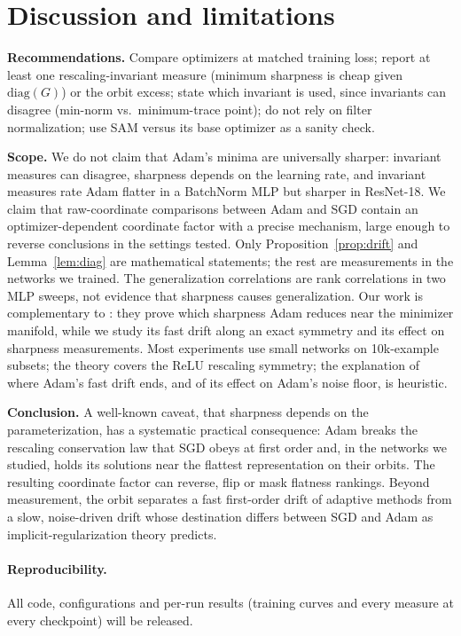 \documentclass[10pt,twocolumn]{article}
\theoremstyle{remark}
\begin{document}
\section{Discussion and limitations}
\textbf{Recommendations.} Compare optimizers at matched training loss; report at least one rescaling-invariant measure (minimum sharpness is cheap given $\mathrm{diag}(G)$) or the orbit excess; state which invariant is used, since invariants can disagree (min-norm vs.\ minimum-trace point); do not rely on filter normalization; use SAM versus its base optimizer as a sanity check.

\textbf{Scope.} We do not claim that Adam's minima are universally sharper: invariant measures can disagree, sharpness depends on the learning rate, and invariant measures rate Adam flatter in a BatchNorm MLP but sharper in ResNet-18. We claim that raw-coordinate comparisons between Adam and SGD contain an optimizer-dependent coordinate factor with a precise mechanism, large enough to reverse conclusions in the settings tested. Only Proposition~\ref{prop:drift} and Lemma~\ref{lem:diag} are mathematical statements; the rest are measurements in the networks we trained. The generalization correlations are rank correlations in two MLP sweeps, not evidence that sharpness causes generalization. Our work is complementary to \citet{li2025adam}: they prove which sharpness Adam reduces near the minimizer manifold, while we study its fast drift along an exact symmetry and its effect on sharpness measurements. Most experiments use small networks on 10k-example subsets; the theory covers the ReLU rescaling symmetry; the explanation of where Adam's fast drift ends, and of its effect on Adam's noise floor, is heuristic.

\textbf{Conclusion.} A well-known caveat, that sharpness depends on the parameterization, has a systematic practical consequence: Adam breaks the rescaling conservation law that SGD obeys at first order and, in the networks we studied, holds its solutions near the flattest representation on their orbits. The resulting coordinate factor can reverse, flip or mask flatness rankings. Beyond measurement, the orbit separates a fast first-order drift of adaptive methods from a slow, noise-driven drift whose destination differs between SGD and Adam as implicit-regularization theory predicts.

\paragraph{Reproducibility.} All code, configurations and per-run results (training curves and every measure at every checkpoint) will be released.




\clearpage
\onecolumn
\appendix

\end{document}
